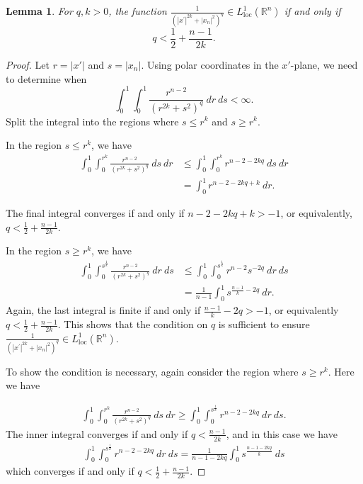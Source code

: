 \documentclass[12pt,reqno]{amsart}%
\theoremstyle{plain}
\newtheorem{lemma}[theorem]{Lemma}
\numberwithin{equation}{section}
\theoremstyle{definition}
\theoremstyle{remark}
\newcommand{\R}{\mathbb{R}}
\begin{document}
\begin{lemma}\label{integral}
For $q, k >0$, the function $\frac{ 1}{(|x^\prime|^{2k} + |x_n|^2)^q } \in L^1_{\mathrm{loc}} ( \R^n)$ if and only if $$ q< \frac 12 + \frac{ n-1}{2k} .$$


\end{lemma} 

\begin{proof} 

Let $r = |x'|$ and $s = |x_n|$.  Using polar coordinates in the $x'$-plane, we need to determine when
$$ \int_0^1 \int_0^1 \frac{r^{n-2}} {( r^{2k} + s^2 )^q} \: dr \: ds < \infty.$$
Split the integral into the regions where $s\leq r^k $ and $s\geq r^k $. 


In the region $s \leq r^k$, we have 
\begin{align*} \int_0^1 \int _0^{r^k} \frac{ r^{n-2}} { ( r^{2k} + s^ 2 ) ^q } \: ds \: dr &\leq \int_0^1 \int _0^{r^k} r^{n-2-2kq } \: ds \: dr\\
& = \int_0^1 r^{n-2-2kq+k} \: dr. 
\end{align*}

The final integral converges if and only if $n-2-2kq + k > -1$, or equivalently, $q < \frac 12 + \frac{n-1}{2k} .$

In the region $s\geq r^k $, we have 
\begin{align*} \int_0^1 \int _0^{s^{\frac1k}} \frac{ r^{n-2}} { ( r^{2k} + s^ 2 ) ^q } \: dr \: ds &\leq \int_0^1 \int _0^{s^{\frac 1k} } r^{n-2 } s^{-2q}  \: dr \: ds\\
& = \frac{1}{n-1} \int_0^1 s^{\frac{n-1}{k}-2q } \: dr. 
\end{align*}
Again, the last integral is finite if and only if $\frac{ n-1}{k} - 2q > -1$, or equivalently $q < \frac 12 + \frac {n-1}{2k}.$ This shows that the condition on $q$ is sufficient to ensure $\frac{ 1}{(|x^\prime|^{2k} + |x_n|^2)^q } \in L^1_{\mathrm{loc}} ( \R^n)$. 

To show the condition is necessary, again consider the region where $s\geq r^k$. Here we have 

\begin{align*} \int_0^1 \int _0^{r^k} \frac{ r^{n-2}} { ( r^{2k} + s^ 2 ) ^q } \: ds \: dr \geq \int _0^1 \int _0^{s^{\frac 1k} } r^{n-2 - 2kq } \: dr \: ds.
\end{align*} 
The inner integral converges if and only if $q < \frac { n-1} {2k} $, and in this case we have 
\begin{align*} 
\int _0^1 \int _0^{s^{\frac 1k} } r^{n-2 - 2kq } \: dr \: ds = \frac{ 1}{n-1-2kq } \int_0^1 s^{\frac{ n-1 - 2kq }{k}} \: ds 
\end{align*} 
which converges if and only if $q < \frac 12 + \frac {n-1}{2k}.$
\end{proof} 
\end{document}
